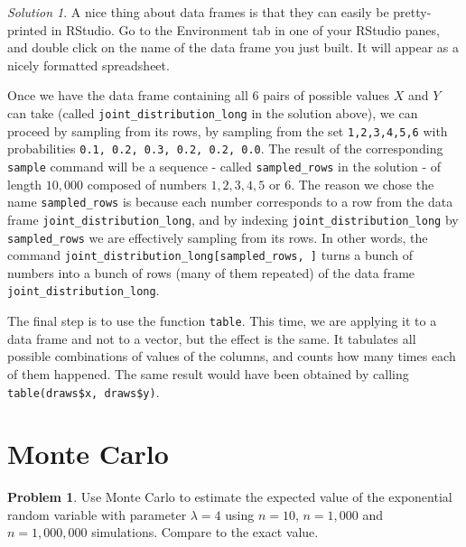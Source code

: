 \documentclass[
]{book}
\theoremstyle{definition}
\theoremstyle{definition}
\theoremstyle{definition}
\newtheorem{exercise}{Problem}[chapter]
\theoremstyle{definition}
\theoremstyle{remark}
\newtheorem*{solution}{Solution}
\begin{document}
\begin{solution}
A nice thing about data frames is that they can easily be pretty-printed in
RStudio. Go to the Environment tab in one of your RStudio panes, and double
click on the name of the data frame you just built. It will appear as a nicely
formatted spreadsheet.

Once we have the data frame containing all \(6\) pairs of possible values \(X\) and
\(Y\) can take (called \texttt{joint\_distribution\_long} in the solution above), we can
proceed by sampling from its rows, by sampling from the set \texttt{1,2,3,4,5,6} with
probabilities \texttt{0.1,\ 0.2,\ 0.3,\ 0.2,\ 0.2,\ 0.0}. The result of the corresponding
\texttt{sample} command will be a sequence - called \texttt{sampled\_rows} in the solution - of
length \(10,000\) composed of numbers \(1,2,3,4,5\) or \(6\). The reason we chose the
name \texttt{sampled\_rows} is because each number corresponds to a row from the data
frame \texttt{joint\_distribution\_long}, and by indexing \texttt{joint\_distribution\_long} by
\texttt{sampled\_rows} we are effectively sampling from its rows. In other words, the
command \texttt{joint\_distribution\_long{[}sampled\_rows,\ {]}} turns a bunch of numbers into
a bunch of rows (many of them repeated) of the data frame
\texttt{joint\_distribution\_long}.

The final step is to use the function \texttt{table}. This time, we are applying it to
a data frame and not to a vector, but the effect is the same. It tabulates all
possible combinations of values of the columns, and counts how many times each
of them happened. The same result would have been obtained by calling
\texttt{table(draws\$x,\ draws\$y)}.
\end{solution}

\hypertarget{monte-carlo}{%
\section{Monte Carlo}\label{monte-carlo}}

\begin{exercise}
Use Monte Carlo to estimate the expected value of the exponential random
variable with parameter \(\lambda= 4\) using \(n=10\), \(n=1,000\) and \(n=1,000,000\)
simulations. Compare to the exact value.
\end{exercise}
\end{document}
